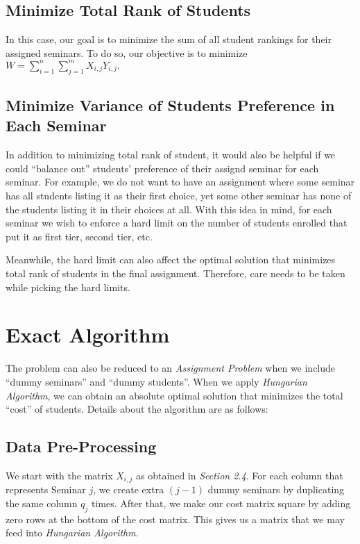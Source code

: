 \documentclass{article} %
\begin{document}
\subsection{Minimize Total Rank of Students}
    \par\qquad In this case, our goal is to minimize the sum of all student rankings for their assigned seminars. To do so, our objective is to minimize $W = \sum_{i=1}^{n}{\sum_{j=1}^{m}{X_{i,j}Y_{i,j}}}.$
\subsection{Minimize Variance of Students Preference in Each Seminar}
    \par\qquad In addition to minimizing total rank of student, it would also be helpful if we could ``balance out'' students' preference of their assignd seminar for each seminar. For example, we do not want to have an assignment where some seminar has all students listing it as their first choice, yet some other seminar has none of the students listing it in their choices at all. With this idea in mind, for each seminar we wish to enforce a hard limit on the number of students enrolled that put it as first tier, second tier, etc.
    \par\qquad Meanwhile, the hard limit can also affect the optimal solution that minimizes total rank of students in the final assignment. Therefore, care needs to be taken while picking the hard limits.
%
%
%
\section{Exact Algorithm}
    \par\qquad The problem can also be reduced to an \emph{Assignment Problem} when we include ``dummy seminars'' and ``dummy students''. When we apply \emph{Hungarian Algorithm}, we can obtain an absolute optimal solution that minimizes the total ``cost'' of students. Details about the algorithm are as follows:
    
\subsection{Data Pre-Processing}
    \par\qquad We start with the matrix $X_{i,j}$ as obtained in \emph{Section 2.4}. For each column that represents Seminar $j$, we create extra $(j-1)$ dummy seminars by duplicating the same column $q_j$ times. After that, we make our cost matrix square by adding zero rows at the bottom of the cost matrix. This gives us a matrix that we may feed into \emph{Hungarian Algorithm}.
\end{document}
